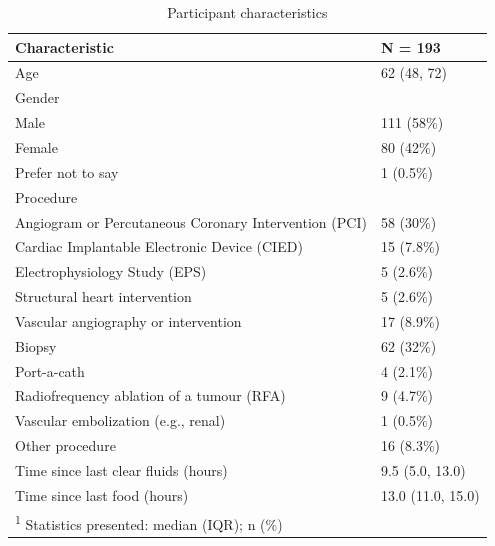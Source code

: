 \documentclass[12pt,twocolumn,twoside,]{pinp}
\begin{document}
\begin{table}

\caption{\label{tab:tab1pdf}Participant characteristics}
\centering
\begin{tabular}[t]{ll}
\toprule
Characteristic & N = 193\\
\midrule
Age & 62 (48, 72)\\
Gender & \\
\hspace{1em}Male & 111 (58\%)\\
\hspace{1em}Female & 80 (42\%)\\
\hspace{1em}Prefer not to say & 1 (0.5\%)\\
\addlinespace
Procedure & \\
\hspace{1em}Angiogram or Percutaneous Coronary Intervention (PCI) & 58 (30\%)\\
\hspace{1em}Cardiac Implantable Electronic Device (CIED) & 15 (7.8\%)\\
\hspace{1em}Electrophysiology Study (EPS) & 5 (2.6\%)\\
\hspace{1em}Structural heart intervention & 5 (2.6\%)\\
\addlinespace
\hspace{1em}Vascular angiography or intervention & 17 (8.9\%)\\
\hspace{1em}Biopsy & 62 (32\%)\\
\hspace{1em}Port-a-cath & 4 (2.1\%)\\
\hspace{1em}Radiofrequency ablation of a tumour (RFA) & 9 (4.7\%)\\
\hspace{1em}Vascular embolization (e.g., renal) & 1 (0.5\%)\\
\addlinespace
\hspace{1em}Other procedure & 16 (8.3\%)\\
Time since last clear fluids (hours) & 9.5 (5.0, 13.0)\\
Time since last food (hours) & 13.0 (11.0, 15.0)\\
\bottomrule
\multicolumn{2}{l}{\textsuperscript{1} Statistics presented: median (IQR); n (\%)}\\
\end{tabular}
\end{table}
\end{document}
